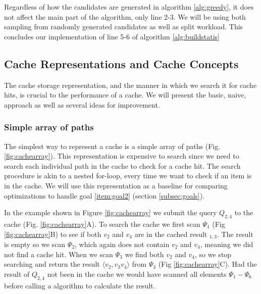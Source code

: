 Regardless of how the candidates are generated in algorithm \ref{alg:greedy}, it does not affect the main part of the algorithm, only line 2-3. We will be using both sampling from randomly generated candidates as well as split workload. This concludes our implementation of line 5-6 of algorithm \ref{alg:buildstatis}


\subsection{Cache Representations and Cache Concepts} \label{subsec:cacherepresentatons}
The cache storage representation, and the manner in which we search it for cache hits, is crucial to the performance of a cache. We will present the basic, naive, approach as well as several ideas for improvement.
% 
\subsubsection{Simple array of paths}
The simplest way to represent a cache is a simple array of paths (Fig. \ref{fig:cachearray}). This representation is expensive to search since we need to search each individual path in the cache to check for a cache hit. The search procedure is akin to a nested for-loop, every time we want to check if an item is in the cache. We will use this representation as a baseline for comparing optimizations to handle goal \ref{item:goal2} (section \ref{subsec:goals}).

In the example shown in Figure \ref{fig:cachearray} we submit the query $Q_{2,4}$ to the cache (Fig. \ref{fig:cachearray}A). To search the cache we first scan $\Psi_1$ (Fig \ref{fig:cachearray}B) to see if both $v_2$ and $v_4$ are in the cached \spath result \spathns$_{1,3}$. The result is empty so we scan $\Psi_{2}$, which again does not contain $v_2$ and $v_4$, meaning we did not find a cache hit. When we scan $\Psi_3$ we find both $v_2$ and $v_4$, so we stop searching and return the result $\langle v_2,v_3v_4 \rangle$ from $\Psi_3$ (Fig \ref{fig:cachearray}C). Had the result of $Q_{2,4}$ not been in the cache we would have scanned all elements $\Psi_1 - \Psi_6$ before calling a \spath algorithm to calculate the result.


